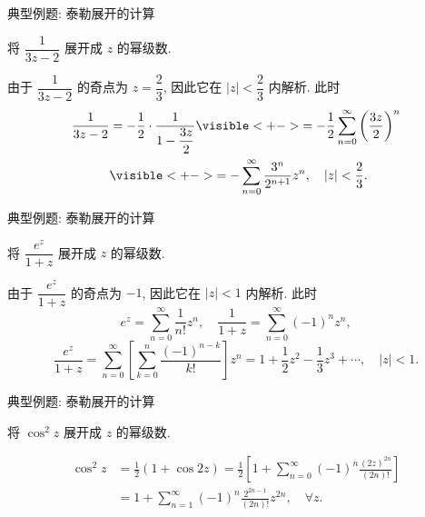 \begin{frame}{典型例题: 泰勒展开的计算}
\begin{example}
将 $\dfrac1{3z-2}$ 展开成 $z$ 的幂级数.
\end{example}
\begin{solution}
由于 $\dfrac1{3z-2}$ 的奇点为 $z=\dfrac23$, 因此它在 $|z|<\dfrac23$ 内解析.
\onslide<+->
此时
\begin{align*}
\frac1{3z-2}&=-\frac12\cdot\frac1{1-\dfrac{3z}2}
	\visible<+->{=-\frac12\sum_{n=0}^\infty\left(\frac{3z}2\right)^n}\\
&\visible<+->{=-\sum_{n=0}^\infty\frac{3^n}{2^{n+1}}z^n,\quad|z|<\frac23.}
\end{align*}
\end{solution}
\end{frame}


\begin{frame}{典型例题: 泰勒展开的计算}
\begin{example}
将 $\dfrac{e^z}{1+z}$ 展开成 $z$ 的幂级数.
\end{example}
\begin{solution}
由于 $\dfrac{e^z}{1+z}$ 的奇点为 $-1$, 因此它在 $|z|<1$ 内解析.
\onslide<+->
此时
\[e^z=\sum_{n=0}^\infty\frac1{n!}z^n,\quad
\frac1{1+z}=\sum_{n=0}^\infty(-1)^nz^n,\]
\onslide<+->
\[\dfrac{e^z}{1+z}=\sum_{n=0}^\infty\left[\sum_{k=0}^n\frac{(-1)^{n-k}}{k!}\right]z^n
=1+\frac12z^2-\frac13z^3+\cdots,\quad|z|<1.\]
\end{solution}
\end{frame}


\begin{frame}{典型例题: 泰勒展开的计算}
\begin{exercise}
将 $\cos^2z$ 展开成 $z$ 的幂级数.
\end{exercise}
\vspace{-0.3\baselineskip}
\begin{answer}
\vspace{-\baselineskip}
\begin{align*}
\cos^2z&=\frac12(1+\cos{2z})=\frac12\left[1+\sum_{n=0}^\infty(-1)^n\frac{(2z)^{2n}}{(2n)!}\right]\\
&=1+\sum_{n=1}^\infty(-1)^n\frac{2^{2n-1}}{(2n)!}z^{2n},\quad\forall z.
\end{align*}
\end{answer}
\end{frame}


